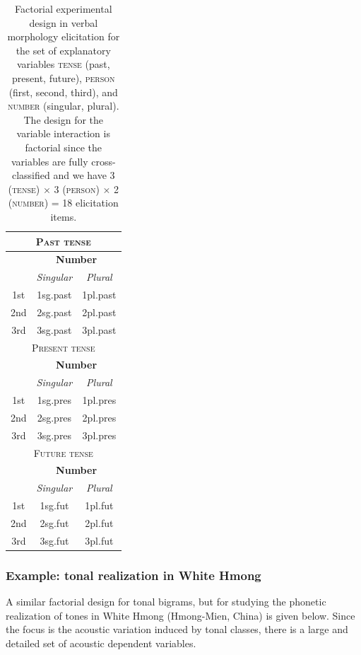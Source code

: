 \documentclass[12pt]{article}
\begin{document}
\begin{table}[ht]
\centering
\begin{tabular}{ccc}
  \hline\hline
  \multicolumn{3}{c}{\textsc{Past tense}}\\\hline
    & \multicolumn{2}{c}{\textbf{Number}}\\
    \cline{2-3}
    & \textit{Singular}  & \textit{Plural}\\
    1st & 1sg.past  & 1pl.past\\
    2nd & 2sg.past & 2pl.past \\
    3rd & 3sg.past & 3pl.past \\
    \hline\hline
  \multicolumn{3}{c}{\textsc{Present tense}}\\\hline
    & \multicolumn{2}{c}{\textbf{Number}}\\
    \cline{2-3}
    & \textit{Singular}  & \textit{Plural}\\
    1st & 1sg.pres  & 1pl.pres\\
    2nd & 2sg.pres & 2pl.pres \\
    3rd & 3sg.pres & 3pl.pres \\
    \hline\hline
  \multicolumn{3}{c}{\textsc{Future tense}}\\\hline
    & \multicolumn{2}{c}{\textbf{Number}}\\
    \cline{2-3}
    & \textit{Singular}  & \textit{Plural}\\
    1st & 1sg.fut  & 1pl.fut\\
    2nd & 2sg.fut & 2pl.fut \\
    3rd & 3sg.fut & 3pl.fut \\
    \hline
\end{tabular}
\caption{Factorial experimental design in verbal morphology
  elicitation for the set of explanatory variables \textsc{tense} (past,
present, future), \textsc{person} (first, second, third), and
\textsc{number} (singular, plural). The design for the variable
interaction is factorial since the variables are fully
cross-classified and we have 3 (\textsc{tense}) $\times $ 3
(\textsc{person}) $\times$ 2 (\textsc{number}) = 18 elicitation
items.}
\label{tab:factorial}
\end{table}

\subsubsection{Example: tonal realization in White Hmong}
\label{sec:hmong}

A similar factorial design for tonal bigrams, but for studying the phonetic
realization of tones in White Hmong (Hmong-Mien, China) is given
below. Since the focus is the acoustic variation induced by tonal
classes, there is a large and detailed set of acoustic dependent
variables. 
\end{document}

